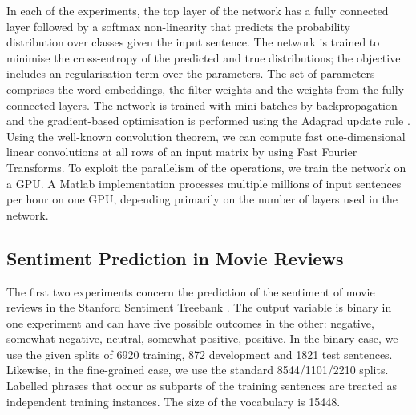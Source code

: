 \documentclass[11pt]{article}
\begin{document}
In each of the experiments, the top layer of the network has a fully connected layer followed by a softmax non-linearity that predicts the probability distribution over classes given the input sentence.
The network is trained to minimise the cross-entropy of the predicted and true distributions; the objective includes an  regularisation term over the parameters.
The set of parameters comprises the word embeddings, the filter weights and the weights from the fully connected layers. The network is trained with mini-batches by backpropagation and the gradient-based optimisation is performed using the Adagrad update rule \cite{duchi2011adagrad}. 
Using the well-known convolution theorem, we can compute fast one-dimensional linear convolutions at all rows of an input matrix by using Fast Fourier Transforms. To exploit the parallelism of the operations, we train the network on a GPU. A Matlab implementation processes multiple millions of input sentences per hour on one GPU, depending primarily on the number of layers used in the network. 




\subsection{Sentiment Prediction in Movie Reviews}
\label{sec:sent}




The first two experiments concern the prediction of the sentiment of movie reviews in the Stanford Sentiment Treebank \cite{Socher-etal:2013}. The output variable is binary in one experiment and can have five possible outcomes in the other: negative, somewhat negative, neutral, somewhat positive, positive. In the binary case, we use the given splits of 6920 training, 872 development and 1821 test sentences. Likewise, in the fine-grained case, we use the standard 8544/1101/2210 splits.   Labelled phrases that occur as subparts of the training sentences are treated as independent training instances. The size of the vocabulary is 15448. 
\end{document}

